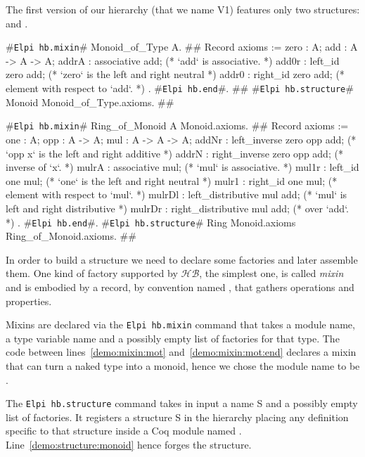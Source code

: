 \documentclass[a4paper,UKenglish,cleveref, autoref]{lipics-v2019}
\newcommand{\HB}{\ensuremath{\mathcal{HB}}}
\newcommand{\mixin}{mixin}
\newcommand{\mixins}{mixins}
\newcommand{\Mixins}{Mixins}
\newcommand{\factory}{factory}
\newcommand{\factories}{factories}
\newcommand{\hbmixin}{{\tt\color{dkgreen}Elpi hb.mixin}}
\newcommand{\hbstructure}{{\tt\color{dkgreen}Elpi hb.structure}}
\newcommand{\hbend}{{\tt\color{dkgreen}Elpi hb.end}}
\theoremstyle{implem}
\theoremstyle{implem}
\theoremstyle{command}
\begin{document}
The first version of our hierarchy (that we name V1) features only two
structures:  and .
\begin{coqcode}
#\hbmixin{}# Monoid_of_Type A.                       #\label{demo:mixin:mot}#
  Record axioms := {
    zero : A;
    add : A -> A -> A;
    addrA : associative add;             (* `add` is associative.                   *)
    add0r : left_id zero add;            (* `zero` is the left and right neutral    *)
    addr0 : right_id zero add;           (*   element with respect to `add`.        *)
  }.
#\hbend{}#.                                              #\label{demo:mixin:mot:end}#
#\hbstructure{}# Monoid Monoid_of_Type.axioms.        #\label{demo:structure:monoid}#

#\hbmixin{}# Ring_of_Monoid A Monoid.axioms.       #\label{demo:mixin:rom}#
  Record axioms := {
    one : A;
    opp : A -> A;
    mul : A -> A -> A;
    addNr : left_inverse zero opp add;   (* `opp x` is the left and right additive  *)
    addrN : right_inverse zero opp add;  (*   inverse of `x`.                       *)
    mulrA : associative mul;             (* `mul` is associative.                   *)
    mul1r : left_id one mul;             (* `one` is the left and right neutral     *)
    mulr1 : right_id one mul;            (*   element with respect to `mul`.        *)
    mulrDl : left_distributive mul add;  (* `mul` is left and right distributive    *)
    mulrDr : right_distributive mul add; (*   over `add`.                           *)
  }.
#\hbend{}#.
#\hbstructure{}# Ring Monoid.axioms Ring_of_Monoid.axioms. #\label{demo:structure:ring}#

\end{coqcode}

In order to build a structure we need to declare some \factories{} and
later assemble them. One kind of \factory{} supported by \HB{}, the simplest
one, is called \emph{\mixin{}} and is embodied by a record, by convention named
, that gathers operations and properties.

\Mixins{} are declared via the \hbmixin{} command
that takes a module name,
a type variable name and a possibly empty list of \factories{} for that type.
The code between lines~\ref{demo:mixin:mot}
and~\ref{demo:mixin:mot:end} declares a \mixin{} that can turn a naked
type  into a monoid, hence we chose the module name to be .

The \hbstructure{} command takes in input a name S and a possibly
empty list of \factories{}.
It registers a structure S in the hierarchy placing
any definition specific to that structure inside a Coq module named .
Line~\ref{demo:structure:monoid} hence forges the  structure.
\end{document}
